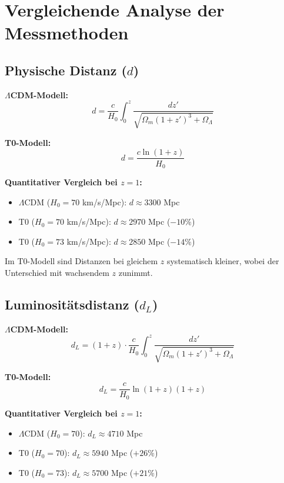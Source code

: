 \documentclass[a4paper,12pt]{article}
\theoremstyle{definition}
\theoremstyle{remark}
\begin{document}
	\section{Vergleichende Analyse der Messmethoden}
	
	\subsection{Physische Distanz ($d$)}
	
	\textbf{\(\Lambda\)CDM-Modell:}
	\begin{equation}
		d = \frac{c}{H_0} \int_0^z \frac{dz'}{\sqrt{\Omega_m (1 + z')^3 + \Omega_\Lambda}}
	\end{equation}
	
	\textbf{T0-Modell:}
	\begin{equation}
		d = \frac{c \ln(1 + z)}{H_0}
	\end{equation}
	
	\textbf{Quantitativer Vergleich bei $z = 1$:}
	\begin{itemize}
		\item \(\Lambda\)CDM ($H_0 = 70$ km/s/Mpc): $d \approx 3300$ Mpc
		\item T0 ($H_0 = 70$ km/s/Mpc): $d \approx 2970$ Mpc ($-10\%$)
		\item T0 ($H_0 = 73$ km/s/Mpc): $d \approx 2850$ Mpc ($-14\%$)
	\end{itemize}
	
	Im T0-Modell sind Distanzen bei gleichem $z$ systematisch kleiner, wobei der Unterschied mit wachsendem $z$ zunimmt.
	
	\subsection{Luminositätsdistanz ($d_L$)}
	
	\textbf{\(\Lambda\)CDM-Modell:}
	\begin{equation}
		d_L = (1 + z) \cdot \frac{c}{H_0} \int_0^z \frac{dz'}{\sqrt{\Omega_m (1 + z')^3 + \Omega_\Lambda}}
	\end{equation}
	
	\textbf{T0-Modell:}
	\begin{equation}
		d_L = \frac{c}{H_0} \ln(1 + z) (1 + z)
	\end{equation}
	
	\textbf{Quantitativer Vergleich bei $z = 1$:}
	\begin{itemize}
		\item \(\Lambda\)CDM ($H_0 = 70$): $d_L \approx 4710$ Mpc
		\item T0 ($H_0 = 70$): $d_L \approx 5940$ Mpc ($+26\%$)
		\item T0 ($H_0 = 73$): $d_L \approx 5700$ Mpc ($+21\%$)
	\end{itemize}
	
\end{document}
